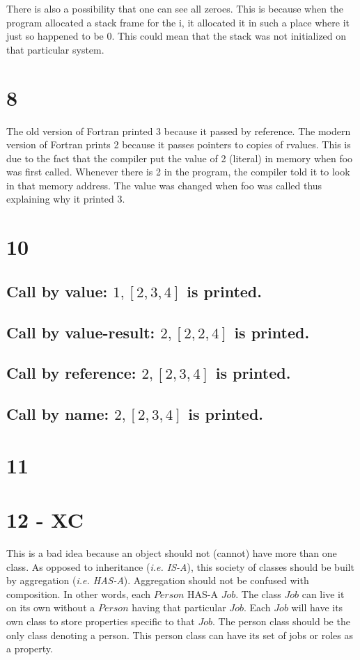 \documentclass[11pt, oneside]{article}
\begin{document}
There is also a possibility that one can see all zeroes. This is because when the program allocated a stack frame for the i, it allocated it in such a place where it just so happened to be 0. This could mean that the stack was not initialized on that particular system.

\section*{8}
The old version of Fortran printed 3 because it passed by reference. The modern version of Fortran prints 2 because it passes pointers to copies of rvalues. This is due to the fact that the compiler put the value of 2 (literal) in memory when foo was first called. Whenever there is 2 in the program, the compiler told it to look in that memory address. The value was changed when foo was called thus explaining why it printed 3.

\section*{10}
\subsection*{Call by value: $1, [2, 3, 4]$ is printed.}
\subsection*{Call by value-result: $2, [2, 2, 4]$ is printed.}
\subsection*{Call by reference: $2, [2, 3, 4]$ is printed.}
\subsection*{Call by name: $2, [2, 3, 4]$ is printed.}

\section*{11}


\section*{12 - XC}
This is a bad idea because an object should not (cannot) have more than one class. As opposed to inheritance (\textit{i.e. IS-A}), this society of classes should be built by aggregation (\textit{i.e. HAS-A}). Aggregation should not be confused with composition. In other words, each $Person$ HAS-A $Job$. The class $Job$ can live it on its own without a $Person$ having that particular $Job$. Each $Job$ will have its own class to store properties specific to that $Job$. The person class should be the only class denoting a person. This person class can have its set of jobs or roles as a property.
\end{document}
